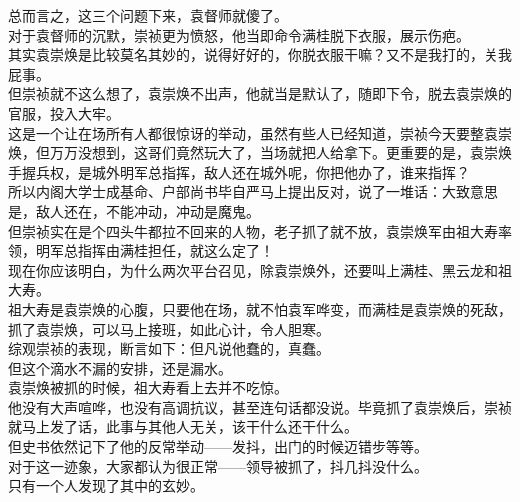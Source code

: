 \begin{multicols}{\theparacolNo}
总而言之，这三个问题下来，袁督师就傻了。\\

对于袁督师的沉默，崇祯更为愤怒，他当即命令满桂脱下衣服，展示伤疤。\\

其实袁崇焕是比较莫名其妙的，说得好好的，你脱衣服干嘛？又不是我打的，关我屁事。\\

但崇祯就不这么想了，袁崇焕不出声，他就当是默认了，随即下令，脱去袁崇焕的官服，投入大牢。\\

这是一个让在场所有人都很惊讶的举动，虽然有些人已经知道，崇祯今天要整袁崇焕，但万万没想到，这哥们竟然玩大了，当场就把人给拿下。更重要的是，袁崇焕手握兵权，是城外明军总指挥，敌人还在城外呢，你把他办了，谁来指挥？\\

所以内阁大学士成基命、户部尚书毕自严马上提出反对，说了一堆话：大致意思是，敌人还在，不能冲动，冲动是魔鬼。\\

但崇祯实在是个四头牛都拉不回来的人物，老子抓了就不放，袁崇焕军由祖大寿率领，明军总指挥由满桂担任，就这么定了！\\

现在你应该明白，为什么两次平台召见，除袁崇焕外，还要叫上满桂、黑云龙和祖大寿。\\

祖大寿是袁崇焕的心腹，只要他在场，就不怕袁军哗变，而满桂是袁崇焕的死敌，抓了袁崇焕，可以马上接班，如此心计，令人胆寒。\\

综观崇祯的表现，断言如下：但凡说他蠢的，真蠢。\\

但这个滴水不漏的安排，还是漏水。\\

袁崇焕被抓的时候，祖大寿看上去并不吃惊。\\

他没有大声喧哗，也没有高调抗议，甚至连句话都没说。毕竟抓了袁崇焕后，崇祯就马上发了话，此事与其他人无关，该干什么还干什么。\\

但史书依然记下了他的反常举动——发抖，出门的时候迈错步等等。\\

对于这一迹象，大家都认为很正常——领导被抓了，抖几抖没什么。\\

只有一个人发现了其中的玄妙。\\


\end{multicols}
